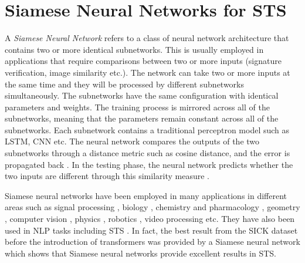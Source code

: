 \chapter{\label{cha:sts_siamese_neural_networks}Siamese Neural Networks for STS}

A \textit{Siamese Neural Network} refers to a class of neural network architecture that contains two or more identical subnetworks. This is usually employed in applications that require comparisons between two or more inputs (signature verification, image similarity etc.). The network can take two or more inputs at the same time and they will be processed by different subnetworks simultaneously. The subnetworks have the same configuration with identical parameters and weights. The training process is mirrored across all of the subnetworks, meaning that the parameters remain constant across all of the subnetworks. Each subnetwork contains a traditional perceptron model such as LSTM, CNN etc. The neural network compares the outputs of the two subnetworks through a distance metric such as cosine distance, and the error is propagated back \autocite{Mueller_Thyagarajan_2016}. In the testing phase, the neural network predicts whether the two inputs are different through this similarity measure \autocite{neculoiu-etal-2016-learning}. 

Siamese neural networks have been employed in many applications in different areas such as signal processing \autocite{thiolliere2015hybrid, 8461524, 8268960, 8453811, 10.1007/978-3-319-66429-3_11, 8064706, 8268994, Zeghidour2016}, biology \autocite{10.1093/bioinformatics/bty887, Szubert2019}, chemistry and pharmacology \autocite{10.1093/bioinformatics/btz411}, geometry \autocite{10.1093/jcde/qwaa003}, computer vision  \autocite{6797067,1467314,rs10020355,21be1428c6a44fb7a32d49ba83126bcb,6976727,6636646,Taigman_2014_CVPR,7163112,8269987,HANIF201954}, physics \autocite{Zou18, DEBAETS2019645}, robotics \autocite{Utkin2017, 7970671, 8461044}, video processing \autocite{AAAI1816790, 8036238, Liu2018, 8587153} etc. They have also been used in NLP tasks \autocite{10.5555/2018936.2018965,10.1145/3209978.3210144,Gonzalez2019} including STS \autocite{das-etal-2016-together, neculoiu-etal-2016-learning, Mueller_Thyagarajan_2016}. In fact, the best result from the SICK dataset \autocite{marelli-etal-2014-semeval} before the introduction of transformers was provided by a Siamese neural network \autocite{Mueller_Thyagarajan_2016} which shows that Siamese neural networks provide excellent results in STS. 

